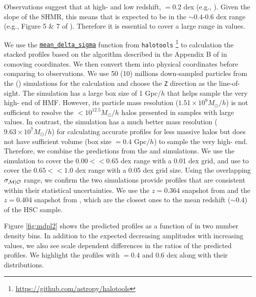 \documentclass[fleqn,usenatbib,useAMS]{mnras}
\begin{document}
    Observations suggest that at high-\mhalo{} and low redshift, \scatterObsSymMhalo{}$=0.2$ dex
    (e.g., \citealt{More2011, Leauthaud2012, Reddick2013, Behroozi2013, Tinker2017}). 
    Given the slope of the SHMR, this means that \scatterMhaloObsSym{} is expected to be in the
    $\sim 0.4$-0.6 dex range (e.g., Figure 5 \& 7 of \citealt{Wechsler2018}). 
    Therefore it is essential to cover a large range in \scatterMhaloObsSym{} values.
    
    We use the
    \href{https://halotools.readthedocs.io/en/latest/api/halotools.mock_observables.mean_delta_sigma.html}{\texttt{mean\_delta\_sigma}}
    function from \texttt{halotools} \citep{Hearin2017}\footnote{
    \url{https://github.com/astropy/halotools}} to calculation the stacked \dsigma{} profiles based
    on the algorithm described in the Appendix B of \citet{Lange2019} in comoving coordinates.
    We then convert them into physical coordinates before comparing to observations.
    We use 50 (10) millions down-sampled particles from the  (\smdpl{}) simulations for the 
    calculation and choose the \texttt{Z} direction as the line-of-sight.
    The  simulation has a large box size of 1 Gpc$/h$ that helps sample the very
    high-\mhalo{} end of HMF.
    However, its particle mass resolution ($1.51 \times 10^{9} M_{\odot}/h$) is not sufficient to
    resolve the $< 10^{12.5} M_{\odot}/h$ halos presented in samples with large
    \scatterMhaloObsSym{} values.
    In contrast, the \smdpl{} simulation has a much better mass resolution ($9.63 \times 10^{7}
    M_{\odot}/h$) for calculating accurate \dsigma{} profiles for less massive halos but does not
    have sufficient volume (box size $=0.4$ Gpc$/h$) to sample the very  high-\mvir{} end.
    Therefore, we combine the predictions from the  and \smdpl{} simulations.
    We use the  simulation to cover the $0.00 <$\scatterMhaloObsSym{}$<0.65$ dex range
    with a 0.01 dex grid, and use \smdpl{} to cover the $0.65 <$\scatterMhaloObsSym{}$<1.0$ dex
    range with a 0.05 dex grid size.
    Using the overlapping $\sigma_{\mathcal{M} | \mathcal{O}}{}$ range, we confirm the two simulations provide
    \dsigma{} profiles that are consistent within their statistical uncertainties.
    We use the $z=0.364$ snapshot from  and the $z=0.404$ snapshot from \smdpl{}, which are
    the closest ones to the mean redshift ($\sim 0.4$) of the HSC sample. 
    
    Figure \ref{fig:mdpl2} shows the predicted \dsigma{} profiles as a function of 
    \scatterMhaloObsSym{} in two number density bins. 
    In addition to the expected decreasing \dsigma{} amplitudes with increasing
    \scatterMhaloObsSym{} values, we also see scale dependent differences in the ratios of the
    predicted \dsigma{} profiles.
    We highlight the \dsigma{} profiles with \scatterMhaloObsSym{}$=0.4$ and 0.6 dex along with
    their \mhalo{} distributions.
    
\end{document}
